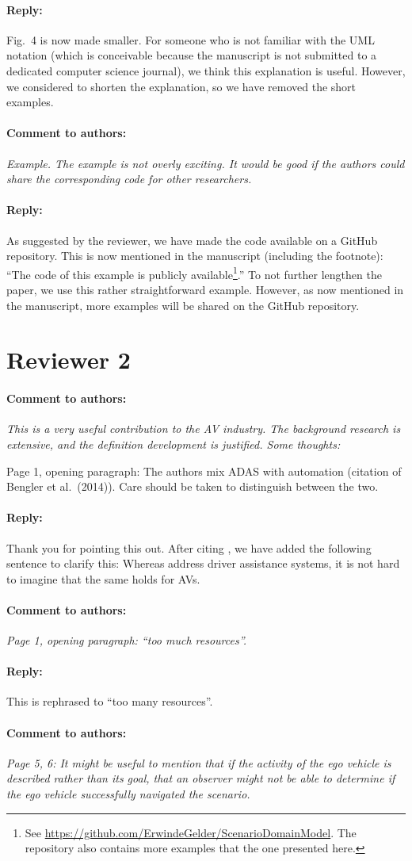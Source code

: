 \documentclass[10pt,final,a4paper,oneside,onecolumn]{article}
\newcommand{\toauthor}{\paragraph*{Comment to authors:} \itshape}
\newcommand{\fromauthor}{\paragraph*{Reply:} \normalfont}
\newcommand{\cstart}{\cbstart\color{red}}
\newcommand{\cend}{\cbend\color{black}}
\begin{document}
\fromauthor Fig.~4 is now made smaller. For someone who is not familiar with the UML notation (which is conceivable because the manuscript is not submitted to a dedicated computer science journal), we think this explanation is useful. However, we considered to shorten the explanation, so we have removed the short examples.



\toauthor Example. The example is not overly exciting. It would be good if the authors could share the corresponding code for other researchers.

\fromauthor As suggested by the reviewer, we have made the code available on a GitHub repository. This is now mentioned in the manuscript (including the footnote): ``\cstart The code of this example is publicly available\footnote{\cstart See \url{https://github.com/ErwindeGelder/ScenarioDomainModel}. The repository also contains more examples that the one presented here.\cend}\cend.'' To not further lengthen the paper, we use this rather straightforward example. However, as now mentioned in the manuscript, more examples will be shared on the GitHub repository.



\section*{Reviewer 2}

\toauthor This is a very useful contribution to the AV industry. The background research is extensive, and the definition development is justified. Some thoughts:

Page 1, opening paragraph: The authors mix ADAS with automation (citation of Bengler et al.\ (2014)). Care should be taken to distinguish between the two.

\fromauthor Thank you for pointing this out. After citing \textcite{bengler2014threedecades}, we have added the following sentence to clarify this: \cstart Whereas \textcite{bengler2014threedecades} address driver assistance systems, it is not hard to imagine that the same holds for AVs.\cend



\toauthor Page 1, opening paragraph: ``too much resources''.

\fromauthor This is rephrased to ``too \cstart many \cend resources''.



\toauthor Page 5, 6: It might be useful to mention that if the activity of the ego vehicle is described rather than its goal, that an observer might not be able to determine if the ego vehicle successfully navigated the scenario.
\end{document}
